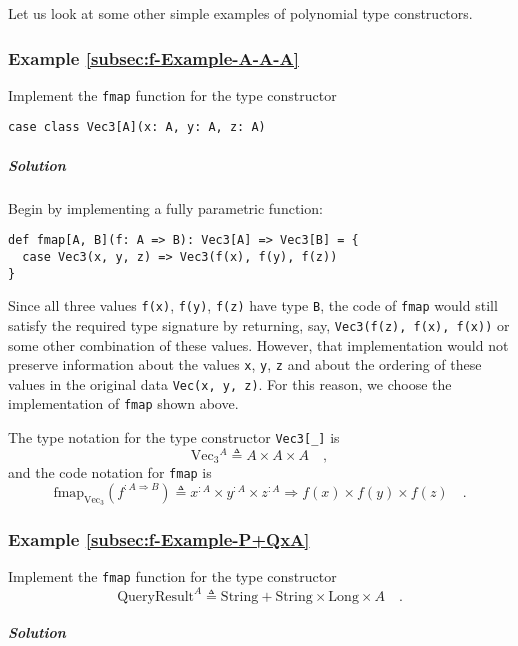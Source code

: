 Let us look at some other simple examples of polynomial type constructors.

\subsubsection{Example \label{subsec:f-Example-A-A-A}\ref{subsec:f-Example-A-A-A}}

Implement the \lstinline!fmap! function for the type constructor
\begin{lstlisting}
case class Vec3[A](x: A, y: A, z: A)
\end{lstlisting}


\subparagraph{Solution}

Begin by implementing a fully parametric function:
\begin{lstlisting}
def fmap[A, B](f: A => B): Vec3[A] => Vec3[B] = {
  case Vec3(x, y, z) => Vec3(f(x), f(y), f(z))
}
\end{lstlisting}
Since all three values \lstinline!f(x)!, \lstinline!f(y)!, \lstinline!f(z)!
have type \lstinline!B!, the code of \lstinline!fmap! would still
satisfy the required type signature by returning, say, \lstinline!Vec3(f(z), f(x), f(x))!
or some other combination of these values. However, that implementation
would not preserve information about the values \lstinline!x!, \lstinline!y!,
\lstinline!z! and about the ordering of these values in the original
data \lstinline!Vec(x, y, z)!. For this reason, we choose the implementation
of \lstinline!fmap! shown above.

The type notation for the type constructor \lstinline!Vec3[_]! is
\[
\text{Vec}_{3}{}^{A}\triangleq A\times A\times A\quad,
\]
and the code notation for \lstinline!fmap! is
\[
\text{fmap}_{\text{Vec}_{3}}(f^{:A\Rightarrow B})\triangleq x^{:A}\times y^{:A}\times z^{:A}\Rightarrow f(x)\times f(y)\times f(z)\quad.
\]


\subsubsection{Example \label{subsec:f-Example-P+QxA}\ref{subsec:f-Example-P+QxA}}

Implement the \lstinline!fmap! function for the type constructor
\[
\text{QueryResult}^{A}\triangleq\text{String}+\text{String}\times\text{Long}\times A\quad.
\]


\subparagraph{Solution}

